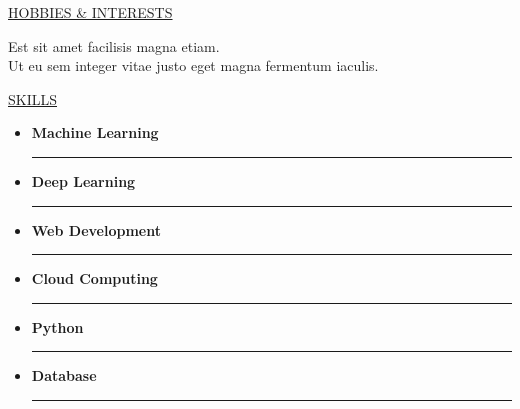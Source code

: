 \documentclass[11pt]{article}
\newcommand{\betteruline}[1]{
    \uline{#1}
}
\newcommand{\sectiontitle}[1]{
    \begingroup
        \titlebold
        \betteruline{\Large\uppercase{#1}  }
        \vspace{1.7mm}
    \endgroup
}
\newcommand{\sectioncontent}[1]{
    \begingroup
        \begin{FlushLeft}
        \vspace{-3mm}
        \sffamily\small#1
        \end{FlushLeft}
    \endgroup
    \vspace{2mm}
}
\begin{document}
\begin{paracol}{2}
    \sectiontitle{Hobbies \& Interests}
    \sectioncontent{
        Est sit amet facilisis magna etiam.\\
        Ut eu sem integer vitae justo eget magna fermentum iaculis. \\
    }

    \sectiontitle{Skills}
\begin{itemize}[left=0pt]
    \item \textbf{Machine Learning} \\
    \begin{minipage}{0.1\linewidth}
        \hspace*{1mm}\rule{4.5cm}{0.2cm} %
    \end{minipage}
    
    \item \textbf{Deep Learning} \\
    \begin{minipage}{0.1\linewidth}
        \hspace*{1mm}\rule{4.5cm}{0.2cm} %
    \end{minipage}
    
    \item \textbf{Web Development} \\
    \begin{minipage}{0.1\linewidth}
        \hspace*{1mm}\rule{3.0cm}{0.2cm} %
    \end{minipage}

        \item \textbf{Cloud Computing} \\
    \begin{minipage}{0.1\linewidth}
        \hspace*{1mm}\rule{4cm}{0.2cm} %
    \end{minipage}

    \item \textbf{Python} \\
    \begin{minipage}{0.1\linewidth}
        \hspace*{1mm}\rule{5cm}{0.2cm} %
    \end{minipage}

    \item \textbf{Database} \\
    \begin{minipage}{0.1\linewidth}
        \hspace*{1mm}\rule{4cm}{0.2cm} %
    \end{minipage}
\end{itemize}


\end{paracol}
\end{document}
